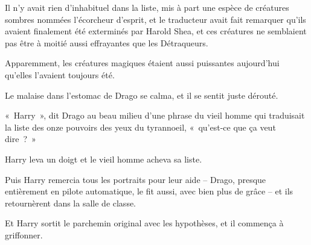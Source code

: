 Il n'y avait rien d'inhabituel dans la liste, mis à part une espèce de créatures sombres nommées l'écorcheur d'esprit, et le traducteur avait fait remarquer qu'ils avaient finalement été exterminés par Harold Shea, et ces créatures ne semblaient pas être à moitié aussi effrayantes que les Détraqueurs.

Apparemment, les créatures magiques étaient aussi puissantes aujourd'hui qu'elles l'avaient toujours été.

Le malaise dans l'estomac de Drago se calma, et il se sentit juste dérouté.

«~Harry~», dit Drago au beau milieu d'une phrase du vieil homme qui traduisait la liste des onze pouvoirs des yeux du tyrannoeil, «~qu'est-ce que ça veut dire~?~»

Harry leva un doigt et le vieil homme acheva sa liste.

Puis Harry remercia tous les portraits pour leur aide -- Drago, presque entièrement en pilote automatique, le fit aussi, avec bien plus de grâce -- et ils retournèrent dans la salle de classe.

Et Harry sortit le parchemin original avec les hypothèses, et il commença à griffonner.

